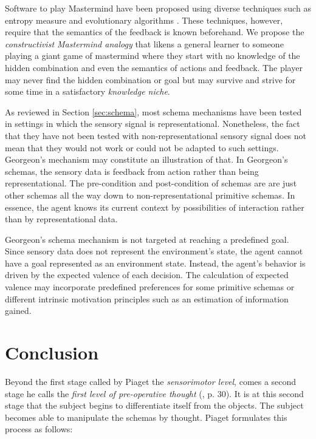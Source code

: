 \documentclass[runningheads]{llncs}
\begin{document}
Software to play Mastermind have been proposed using diverse techniques such as entropy measure and evolutionary algorithms \cite{cotta_entropy-driven_2010}.
These techniques, however, require that the semantics of the feedback is known beforehand. 
We propose the \textit{constructivist Mastermind analogy} that likens a general learner to someone playing a giant game of mastermind where they start with no knowledge of the hidden combination and even the semantics of actions and feedback.
The player may never find the hidden combination or goal but may survive and strive for some time in a satisfactory \textit{knowledge niche}.

As reviewed in Section \ref{sec:schema}, most schema mechanisms have been tested in settings in which the sensory signal is representational.
Nonetheless, the fact that they have not been tested with non-representational sensory signal does not mean that they would not work or could not be adapted to such settings. 
Georgeon's mechanism may constitute an illustration of that.  
In Georgeon's schemas, the sensory data is feedback from action rather than being representational. 
The pre-condition and post-condition of schemas are are just other schemas all the way down to non-representational primitive schemas. 
In essence, the agent knows its current context by possibilities of interaction rather than by representational data. 

Georgeon's schema mechanism is not targeted at reaching a predefined goal. Since sensory data does not represent the environment's state, the agent cannot have a goal represented as an environment state. Instead, the agent's behavior is driven by the expected valence of each decision. 
The calculation of expected valence may incorporate predefined preferences for some primitive schemas or different intrinsic motivation principles such as an estimation of information gained. 

\section{Conclusion}

Beyond the first stage called by Piaget the \textit{sensorimotor level}, comes a second stage he calls the \textit{first level of pre-operative thought} (\cite{piaget_lepistemologie_2011}, p. 30). 
It is at this second stage that the subject begins to differentiate itself from the objects. 
The subject becomes able to manipulate the schemas by thought. 
Piaget formulates this process as follows: 
\\
\end{document}
